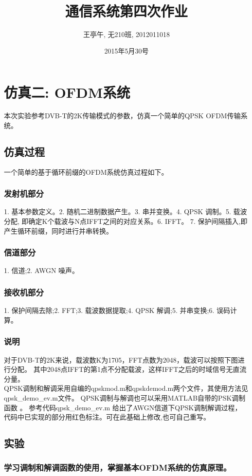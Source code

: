 \documentclass{article}
\begin{document}
\title{通信系统第四次作业}
\author{王亭午, 无210班, 2012011018}
\date{2015年5月30号}
\maketitle
\section{仿真二: OFDM系统}本次实验参考DVB-T的2K传输模式的参数，仿真一个简单的QPSK OFDM传输系统。
\subsection{仿真过程}
一个简单的基于循环前缀的OFDM系统仿真过程如下。
\subsubsection{发射机部分}
1. 基本参数定义。2. 随机二进制数据产生。3. 串并变换。4. QPSK 调制。5. 载波分配,
即确定K个载波与N点IFFT之间的对应关系。6. IFFT。
7. 保护间隔插入,即产生循环前缀，同时进行并串转换。
\subsubsection{信道部分}
1. 信道;2. AWGN 噪声。
\subsubsection{接收机部分}
1. 保护间隔去除;2. FFT;3. 载波数据提取;4. QPSK 解调;5. 并串变换;6. 误码计算。
\subsubsection{说明}
对于DVB-T的2K来说，载波数K为1705，FFT点数为2048，载波可以按照下图进行分配。
其中2048点IFFT的第1点不分配载波，这样IFFT之后的时域信号无直流分量。 \\
QPSK调制和解调采用自编的qpskmod.m和qpskdemod.m两个文件，其使用方法见 qpsk\_demo\_ev.m文件。
QPSK调制与解调也可以采用MATLAB自带的PSK调制函数 。
参考代码qpsk\_demo\_ev.m 给出了AWGN信道下QPSK调制解调过程，
代码中已实现的部分用红色标注。可在此基础上修改,也可自己重写。
\subsection{实验}
\subsubsection{学习调制和解调函数的使用，掌握基本OFDM系统的仿真原理。}
\end{document}
